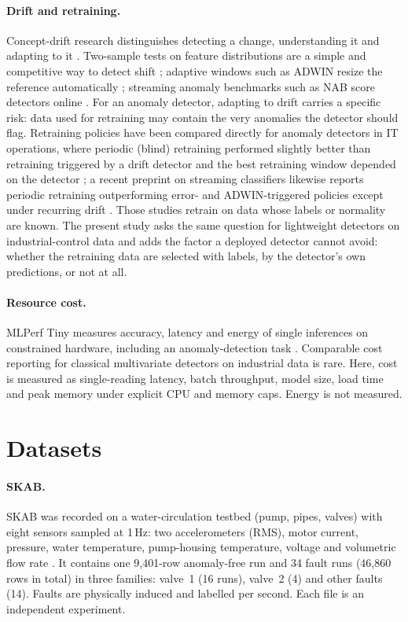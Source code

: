 \documentclass[11pt]{article}
\begin{document}
\paragraph{Drift and retraining.} Concept-drift research distinguishes
detecting a change, understanding it and adapting to it \citep{gama2014,lu2018}.
Two-sample tests on feature distributions are a simple and competitive way to
detect shift \citep{rabanser2019}; adaptive windows such as ADWIN resize the
reference automatically \citep{bifet2007}; streaming anomaly benchmarks such as
NAB score detectors online \citep{ahmad2017}. For an anomaly detector, adapting
to drift carries a specific risk: data used for retraining may contain the very
anomalies the detector should flag. Retraining policies have been compared
directly for anomaly detectors in IT operations, where periodic (blind)
retraining performed slightly better than retraining triggered by a drift
detector and the best retraining window depended on the detector
\citep{poenaru2024}; a recent preprint on streaming classifiers likewise reports
periodic retraining outperforming error- and ADWIN-triggered policies except under
recurring drift \citep{dasari2026}. Those studies retrain on data whose labels or
normality are known. The present study asks the same question for lightweight
detectors on industrial-control data and adds the factor a deployed detector cannot
avoid: whether the retraining data are selected with labels, by the detector's own
predictions, or not at all.

\paragraph{Resource cost.} MLPerf Tiny measures accuracy, latency and energy of
single inferences on constrained hardware, including an anomaly-detection task
\citep{banbury2021}. Comparable cost reporting for classical multivariate
detectors on industrial data is rare. Here, cost is measured as single-reading
latency, batch throughput, model size, load time and peak memory under explicit
CPU and memory caps. Energy is not measured.

\section{Datasets}
\label{sec:data}

\paragraph{SKAB.} SKAB was recorded on a water-circulation testbed (pump,
pipes, valves) with eight sensors sampled at 1\,Hz: two accelerometers (RMS),
motor current, pressure, water temperature, pump-housing temperature, voltage
and volumetric flow rate \citep{skab}. It contains one 9{,}401-row anomaly-free
run and 34 fault runs (46{,}860 rows in total) in three families: valve~1
(16 runs), valve~2 (4) and other faults (14). Faults are physically induced and
labelled per second. Each file is an independent experiment.
\end{document}
